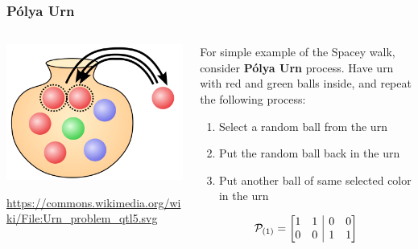 \documentclass{beamer}
\begin{document}
\begin{frame}
  \frametitle{P\'{o}lya Urn}
  \begin{columns}
    \begin{column}{0.4\linewidth}
      \centering
      \includegraphics[width=\linewidth]{images/polya.png}
      \begin{center}
		\tiny
		\url{https://commons.wikimedia.org/wiki/File:Urn_problem_qtl5.svg}
      \end{center}
    \end{column}
    \begin{column}{0.6\linewidth}
      For simple example of the Spacey walk, consider \textbf{P\'{o}lya Urn} process.  Have urn with red and green balls inside, and repeat the following process:
      \begin{enumerate}
      \item Select a random ball from the urn
      \item Put the random ball back in the urn
      \item Put another ball of same selected color in the urn
      \end{enumerate}

      \[ \mathcal{P}_{\left(1\right)} =
        \left[
          \begin{array}{@{}cc|cc@{}}
            1 & 1 & 0 & 0 \\
            0 & 0 & 1 & 1
          \end{array}
        \right]
      \]
    \end{column}
  \end{columns}
\end{frame}
\end{document}
